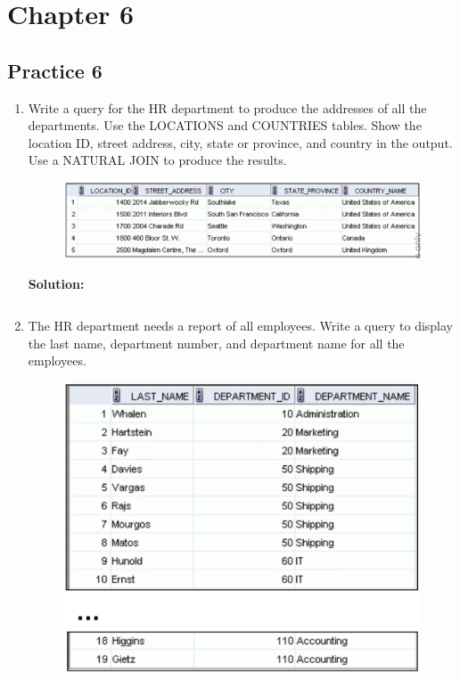 \documentclass[a4paper,12pt]{article}
\begin{document}


\newpage
\section*{Chapter 6}
\subsection*{Practice 6}
\begin{enumerate}
    \item Write a query for the HR department to produce the addresses of all the departments. Use the
LOCATIONS and COUNTRIES tables. Show the location ID, street address, city, state or
province, and country in the output. Use a NATURAL JOIN to produce the results.

    \begin{figure}[h]
        \centering
            \centering
            \includegraphics[width=.6\linewidth]{graphics/61.png}
    \end{figure}
    
    \textbf{Solution: }
    \begin{lstlisting}[language=SQL]

    \end{lstlisting}
        \item The HR department needs a report of all employees. Write a query to display the last name,
department number, and department name for all the employees.
    \begin{figure}[h]
        \centering
            \centering
            \includegraphics[width=.6\linewidth]{graphics/62.png}
    \end{figure}
    

\end{enumerate}
\end{document}
